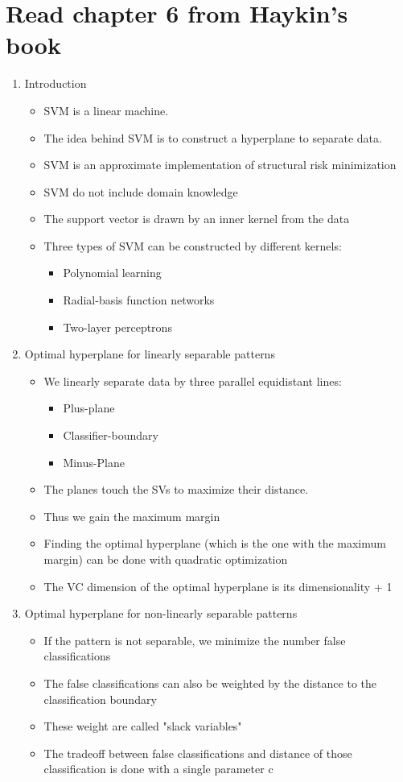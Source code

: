 \documentclass{scrartcl}
\begin{document}
\section{Read chapter 6 from Haykin’s book}
\begin{enumerate}
\item Introduction
	\begin{itemize}
	\item SVM is a linear machine.
	\item The idea behind SVM is to construct a hyperplane to separate data.
	\item SVM is an approximate implementation of structural risk minimization
	\item SVM do not include domain knowledge
	\item The support vector is drawn by an inner kernel from the data
	\item Three types of SVM can be constructed by different kernels:
		\begin{itemize}
		\item Polynomial learning
		\item Radial-basis function networks
		\item Two-layer perceptrons
		\end{itemize}
	\end{itemize}

\item Optimal hyperplane for linearly separable patterns
	\begin{itemize}
	\item We linearly separate data by three parallel equidistant lines:
		\begin{itemize}	
		\item Plus-plane
		\item Classifier-boundary
		\item Minus-Plane
		\end{itemize}
		\item The planes touch the SVs to maximize their distance.
		\item Thus we gain the maximum margin
		\item Finding the optimal hyperplane (which is the one with the maximum margin) can be done with quadratic optimization
		\item The VC dimension of the optimal hyperplane is its dimensionality + 1	\end{itemize}

\item Optimal hyperplane for non-linearly separable patterns
	\begin{itemize}
		\item If the pattern is not separable, we minimize the number false classifications
		\item The false classifications can also be weighted by the distance to the classification boundary
		\item These weight are called "slack variables"
		\item The tradeoff between false classifications and distance of those classification is done with a single parameter c
	\end{itemize}



\end{enumerate}
\end{document}
